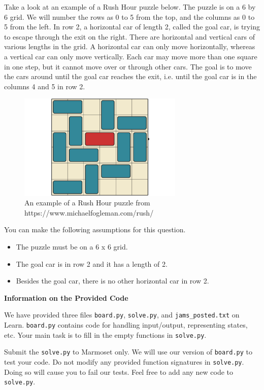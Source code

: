 \documentclass[12pt]{article}
\begin{document}
Take a look at an example of a Rush Hour puzzle below. The puzzle is on a 6 by 6 grid. We will number the rows as 0 to 5 from the top, and the columns as 0 to 5 from the left. In row 2, a horizontal car of length 2, called the goal car, is trying to escape through the exit on the right. There are horizontal and vertical cars of various lengths in the grid. A horizontal car can only move horizontally, whereas a vertical car can only move vertically. Each car may move more than one square in one step, but it cannot move over or through other cars. The goal is to move the cars around until the goal car reaches the exit, i.e. until the goal car is in the columns 4 and 5 in row 2. 

\begin{figure}[ht]
\centering
\includegraphics[width=0.7\textwidth]{images_posted/rush_hour_example.png}
\caption{An example of a Rush Hour puzzle from https://www.michaelfogleman.com/rush/}
\label{rush_hour_example}
\end{figure}

You can make the following assumptions for this question.
\begin{itemize}
  \item The puzzle must be on a 6 x 6 grid.
  \item The goal car is in row 2 and it has a length of 2.
  \item Besides the goal car, there is no other horizontal car in row 2.
\end{itemize}

{\bf Information on the Provided Code}

We have provided three files \verb+board.py+,  \verb+solve.py+, and \verb+jams_posted.txt+ on Learn. \verb+board.py+ contains code for handling input/output, representing states, etc. Your main task is to fill in the empty functions in \verb+solve.py+.

Submit the \verb+solve.py+ to Marmoset only. We will use our version of \verb+board.py+ to test your code. Do not modify any provided function signatures in \verb+solve.py+. Doing so will cause you to fail our tests. Feel free to add any new code to \verb+solve.py+. 
\end{document}
